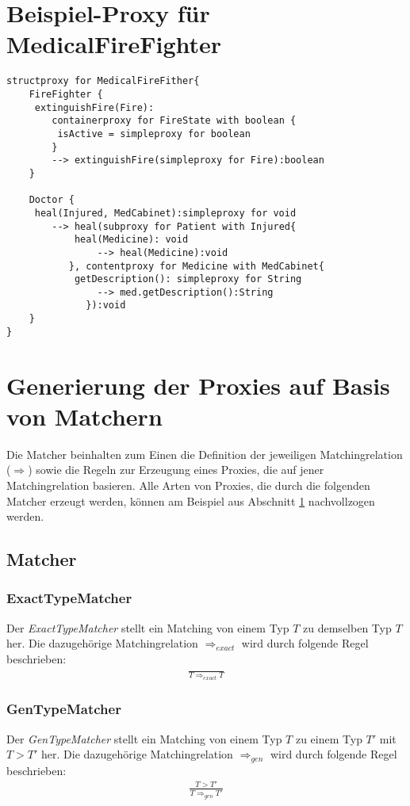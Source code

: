 \documentclass[a4paper,12pt]{article}
\begin{document}
\section{Beispiel-Proxy für MedicalFireFighter}\label{xmpl_prxy}
\begin{lstlisting}[caption={Proxy für MedicalFireFighter},captionpos=b,style = dsl]
structproxy for MedicalFireFither{
	FireFighter {
	 extinguishFire(Fire): 
	 	containerproxy for FireState with boolean {
		 isActive = simpleproxy for boolean		
		} 
		--> extinguishFire(simpleproxy for Fire):boolean
	}
		
	Doctor {
	 heal(Injured, MedCabinet):simpleproxy for void
		--> heal(subproxy for Patient with Injured{
			heal(Medicine):	void
				--> heal(Medicine):void					
		   }, contentproxy for Medicine with MedCabinet{
			getDescription(): simpleproxy for String
				--> med.getDescription():String			
		      }):void		
	}
}
\end{lstlisting}

\newpage
\section{Generierung der Proxies auf Basis von Matchern}
Die Matcher beinhalten zum Einen die Definition der jeweiligen Matchingrelation ($\Rightarrow$) sowie die Regeln zur Erzeugung eines Proxies, die auf jener Matchingrelation basieren. Alle Arten von Proxies, die durch die folgenden Matcher erzeugt werden, können am Beispiel aus Abschnitt \ref{xmpl_prxy} nachvollzogen werden.
\subsection{Matcher}
\subsubsection{ExactTypeMatcher}
Der \emph{ExactTypeMatcher} stellt ein Matching von einem Typ $T$ zu demselben Typ $T$ her. Die dazugehörige Matchingrelation $\Rightarrow_{exact}$ wird durch folgende Regel beschrieben:
\begin{gather*}
\frac{}{T \Rightarrow_{exact} T}
\end{gather*}
\subsubsection{GenTypeMatcher}
Der \emph{GenTypeMatcher} stellt ein Matching von einem Typ $T$ zu einem Typ $T'$ mit $T > T'$ her. Die dazugehörige Matchingrelation $\Rightarrow_{gen}$ wird durch folgende Regel beschrieben:
\begin{gather*}
\frac{T > T'}{T \Rightarrow_{gen} T'}
\end{gather*}
\end{document}
